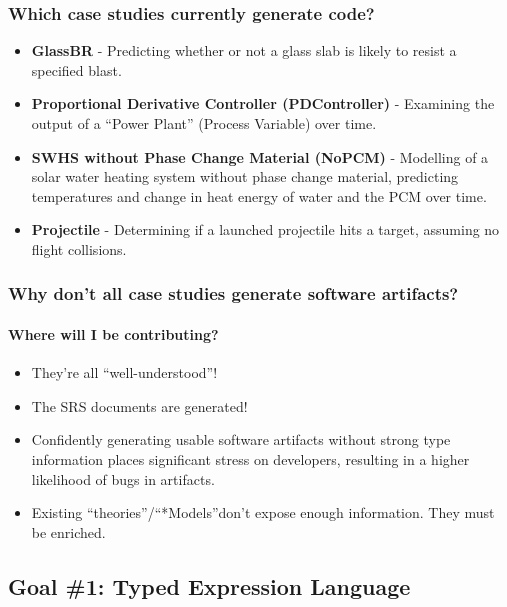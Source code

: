 \documentclass{beamer}
\begin{document}
\begin{frame}
    \frametitle{Which case studies currently generate code?}

    \begin{itemize}
        \item<1-> \textbf{GlassBR} - Predicting whether or not a glass slab is likely to resist a specified blast.
        \item<2-> \textbf{Proportional Derivative Controller (PDController)} - Examining the output of a ``Power Plant'' (Process Variable) over time.
        \item<3-> \textbf{SWHS without Phase Change Material (NoPCM)} - Modelling of a solar water heating system without phase change material, predicting temperatures and change in heat energy of water and the PCM over time.
        \item<4-> \textbf{Projectile} - Determining if a launched projectile hits a target, assuming no flight collisions.
    \end{itemize}
\end{frame}

\begin{frame}
    \frametitle{Why don't all case studies generate software artifacts?}
    \framesubtitle{Where will I be contributing?}

    \begin{itemize}
        \item<3-> They're all ``well-understood''!
        \item<4-> The SRS documents are generated!\\
    \end{itemize}

    \begin{itemize}
        \item<6-> Confidently generating usable software artifacts without strong type information places significant stress on developers, resulting in a higher likelihood of bugs in artifacts.
        \item<7-> Existing ``theories''/``*Models''\footnotemark[1] don't expose enough information. They must be enriched.
    \end{itemize}

\end{frame}

\subsection{Goal \#1: Typed Expression Language}
\end{document}
